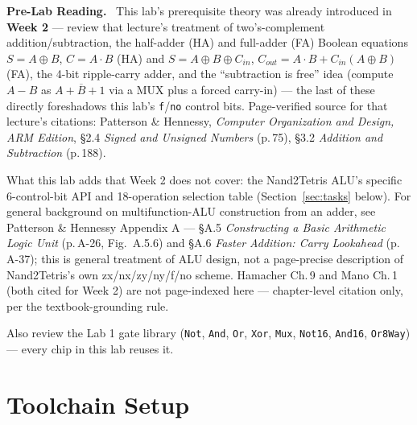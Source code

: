 \documentclass[11pt]{article}
\newenvironment{tocitebox}{%
  \par\noindent\textbf{\textcolor{primary-gold}{Pre-Lab Reading.}}\
}{\par\vspace{0.3em}}
\begin{document}
\begin{tocitebox}
This lab's prerequisite theory was already introduced in \textbf{Week 2} --- review that lecture's treatment of two's-complement addition/subtraction, the half-adder (HA) and full-adder (FA) Boolean equations $S = A\oplus B$, $C = A\cdot B$ (HA) and $S = A\oplus B\oplus C_{in}$, $C_{out} = A\cdot B + C_{in}(A\oplus B)$ (FA), the 4-bit ripple-carry adder, and the ``subtraction is free'' idea (compute $A-B$ as $A+\overline{B}+1$ via a MUX plus a forced carry-in) --- the last of these directly foreshadows this lab's \texttt{f}/\texttt{no} control bits. Page-verified source for that lecture's citations: Patterson \& Hennessy, \emph{Computer Organization and Design, ARM Edition}, \S 2.4 \emph{Signed and Unsigned Numbers} (p.\,75), \S 3.2 \emph{Addition and Subtraction} (p.\,188).

\smallskip
\noindent What this lab adds that Week 2 does not cover: the Nand2Tetris ALU's specific 6-control-bit API and 18-operation selection table (Section~\ref{sec:tasks} below). For general background on multifunction-ALU construction from an adder, see Patterson \& Hennessy Appendix A --- \S A.5 \emph{Constructing a Basic Arithmetic Logic Unit} (p.\,A-26, Fig.\ A.5.6) and \S A.6 \emph{Faster Addition: Carry Lookahead} (p.\,A-37); this is general treatment of ALU design, not a page-precise description of Nand2Tetris's own zx/nx/zy/ny/f/no scheme. Hamacher Ch.\,9 and Mano Ch.\,1 (both cited for Week 2) are not page-indexed here --- chapter-level citation only, per the textbook-grounding rule.

\smallskip
\noindent Also review the Lab 1 gate library (\texttt{Not}, \texttt{And}, \texttt{Or}, \texttt{Xor}, \texttt{Mux}, \texttt{Not16}, \texttt{And16}, \texttt{Or8Way}) --- every chip in this lab reuses it.
\end{tocitebox}

\section{Toolchain Setup}
\end{document}

